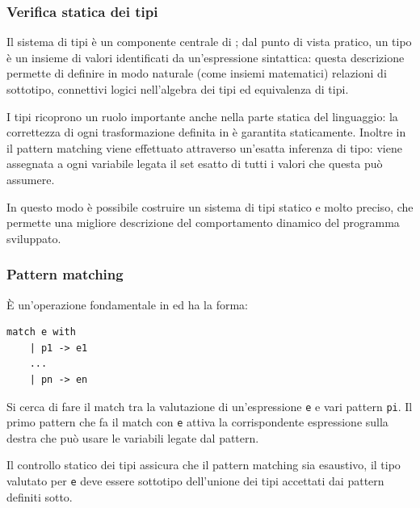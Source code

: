 \subsubsection{Verifica statica dei tipi}
Il sistema di tipi è un componente centrale di \cduce; dal punto di vista pratico, un tipo è un insieme di valori identificati da un'espressione sintattica: questa descrizione permette di definire in modo naturale (come insiemi matematici) relazioni di sottotipo, connettivi logici nell'algebra dei tipi ed equivalenza di tipi.

I tipi ricoprono un ruolo importante anche nella parte statica del linguaggio: la correttezza di ogni trasformazione definita in \cduce è garantita staticamente. Inoltre in \cduce il pattern matching viene effettuato attraverso un'esatta inferenza di tipo: viene assegnata a ogni variabile legata il set esatto di tutti i valori che questa può assumere.

In questo modo è possibile costruire un sistema di tipi statico e molto preciso, che permette una migliore descrizione del comportamento dinamico del programma sviluppato.
\subsubsection{Pattern matching}
\label{CDucePattern}
È un'operazione fondamentale in \cduce ed ha la forma:
\begin{verbatim}
match e with
	| p1 -> e1
	...
	| pn -> en
\end{verbatim}
Si cerca di fare il match tra la valutazione di un'espressione \verb|e| e vari pattern \verb|pi|. Il primo pattern che fa il match con \verb|e| attiva la corrispondente espressione sulla destra che può usare le variabili legate dal pattern.

Il controllo statico dei tipi assicura che il pattern matching sia esaustivo, il tipo valutato per \verb|e| deve essere sottotipo dell'unione dei tipi accettati dai pattern definiti sotto.
